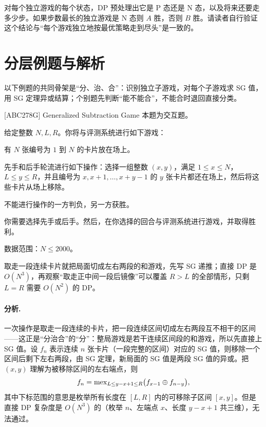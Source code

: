 对每个独立游戏的每个状态，DP 预处理出它是 P 态还是 N 态，以及将来还要走多少步。如果步数最长的独立游戏是 N 态则 $A$ 胜，否则 $B$ 胜。请读者自行验证这个结论与“每个游戏独立地按最优策略走到尽头”是一致的。

\section{分层例题与解析}

以下例题的共同骨架是“分、治、合”：识别独立子游戏，对每个子游戏求 SG 值，用 SG 定理异或结算；个别题先判断“能不能合”，不能合时退回直接分类。

\begin{problem}{[ABC278G] Generalized Subtraction Game}
本题为交互题。

给定整数 $N,L,R$。你将与评测系统进行如下游戏：

有 $N$ 张编号为 $1$ 到 $N$ 的卡片放在场上。

先手和后手轮流进行如下操作：选择一组整数 $(x,y)$，满足 $1\le x\le N$，$L\le y\le R$，并且编号为 $x,x+1,\ldots,x+y-1$ 的 $y$ 张卡片都还在场上，然后将这些卡片从场上移除。

不能进行操作的一方判负，另一方获胜。

你需要选择先手或后手。然后，在你选择的回合与评测系统进行游戏，并取得胜利。

数据范围：$N\le2000$。
\end{problem}

\hint 取走一段连续卡片就把局面切成左右两段的和游戏，先写 SG 递推；直接 DP 是 $O(N^3)$，再观察“取走正中间一段后镜像”可以覆盖 $R>L$ 的全部情形，只剩 $L=R$ 需要 $O(N^2)$ 的 DP。

\sol \paragraph{分析.} 一次操作是取走一段连续的卡片，把一段连续区间切成左右两段互不相干的区间——这正是“分治合”的“分”：整局游戏是若干连续区间段的和游戏，所以先直接上 SG 值。设 $f_n$ 表示连续 $n$ 张卡片（一段完整的区间）对应的 SG 值，则移除一个区间后剩下左右两段，由 SG 定理，新局面的 SG 值是两段 SG 值的异或。把 $(x,y)$ 理解为被移除区间的左右端点，则
\[
 f_n=\operatorname{mex}_{L\le y-x+1\le R}\bigl(f_{x-1}\oplus f_{n-y}\bigr),
\]
其中下标范围的意思是枚举所有长度在 $[L,R]$ 内的可移除子区间 $[x,y]$。但是直接 DP 复杂度是 $O(N^{3})$ 的（枚举 $n$、左端点 $x$、长度 $y-x+1$ 共三维），无法通过。


